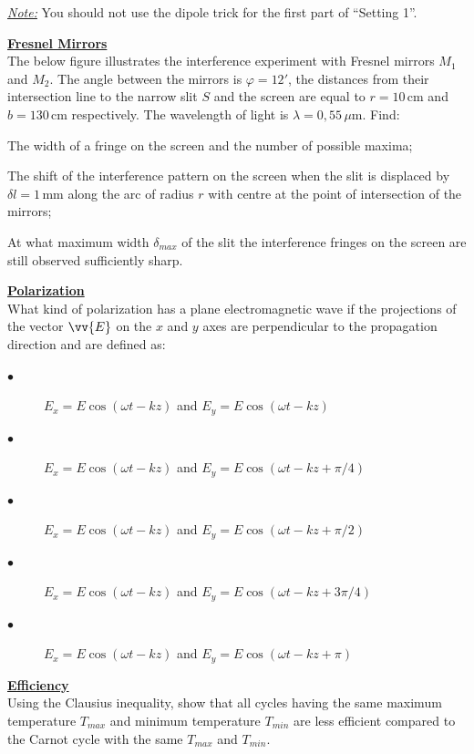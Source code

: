 \documentclass[a4paper]{article}
\begin{document}
	\emph{\underline{Note:}} You should not use the dipole trick for the first part of ``Setting 1''. 
	
	\Problem 
	\textbf{\underline{Fresnel Mirrors}}
	\\
	The below figure illustrates the interference experiment with Fresnel mirrors $M_1$ and $M_2$. The angle between the mirrors is $\varphi = 12'$, the distances from their intersection line to the narrow slit $S$ and the screen are equal to $r = 10\,\mathrm{cm}$ and $b = 130\,\mathrm{cm}$ respectively. The wavelength of light is $\lambda = 0{,}55\,\mu\mathrm{m}$. Find:
	\begin{description}[leftmargin=!, labelwidth=\widthof{$\bullet$}]
		\item[$\bullet$] The width of a fringe on the screen and the number of possible maxima;
		\item[$\bullet$] The shift of the interference pattern on the screen when the slit is displaced by $\delta l = 1\,\mathrm{mm}$ along the arc of radius $r$ with centre at the point of intersection of the mirrors;
		\item[$\bullet$] At what maximum width $\delta_{max}$ of the slit the interference fringes on the screen are still observed sufficiently sharp.
	\end{description}
	
	
	
	\Problem
	\textbf{\underline{Polarization}}
	\\
	What kind of polarization has a plane electromagnetic wave if the projections of the vector $\vv{E}$ on the $x$ and $y$ axes are perpendicular to the propagation direction and are defined as:
	\begin{description}
		\item[$\bullet$] $E_x = E \cos(\omega t - kz)$ and $E_y = E \cos(\omega t - kz)$
		\item[$\bullet$] $E_x = E \cos(\omega t - kz)$ and $E_y = E \cos(\omega t - kz + \pi/4)$
		\item[$\bullet$] $E_x = E \cos(\omega t - kz)$ and $E_y = E \cos(\omega t - kz + \pi/2)$
		\item[$\bullet$] $E_x = E \cos(\omega t - kz)$ and $E_y = E \cos(\omega t - kz + 3\pi/4)$
		\item[$\bullet$] $E_x = E \cos(\omega t - kz)$ and $E_y = E \cos(\omega t - kz + \pi)$
	\end{description}
	
	\Problem
	\textbf{\underline{Efficiency}}
	\\
	Using the Clausius inequality, show that all cycles having the same maximum temperature $T_{max}$ and minimum temperature $T_{min}$ are less efficient compared to the Carnot cycle with the same $T_{max}$ and $T_{min}$.
	
\end{document}
